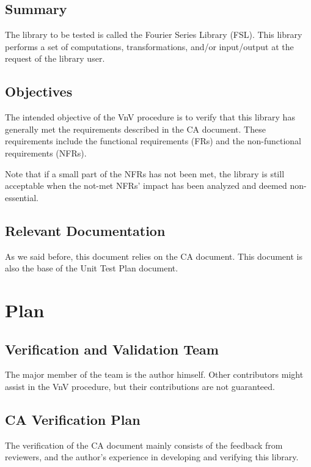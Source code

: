 \documentclass[12pt, titlepage]{article}
\begin{document}
\subsection{Summary}

The library to be tested is called the Fourier Series Library (FSL). This
library performs a set of computations, transformations, and/or input/output at
the request of the library user.

\subsection{Objectives}

The intended objective of the VnV procedure is to verify that this library has
generally met the requirements described in the CA document. These requirements
include the functional requirements (FRs) and the non-functional requirements
(NFRs).

Note that if a small part of the NFRs has not been met, the library is still
acceptable when the not-met NFRs' impact has been analyzed and deemed
non-essential.

\subsection{Relevant Documentation}

As we said before, this document relies on the CA document. This document is
also the base of the Unit Test Plan document.


\section{Plan}
	
\subsection{Verification and Validation Team}

The major member of the team is the author himself. Other contributors might
assist in the VnV procedure, but their contributions are not guaranteed.

\subsection{CA Verification Plan}

The verification of the CA document mainly consists of the feedback from
reviewers, and the author's experience in developing and verifying this library.
\end{document}

